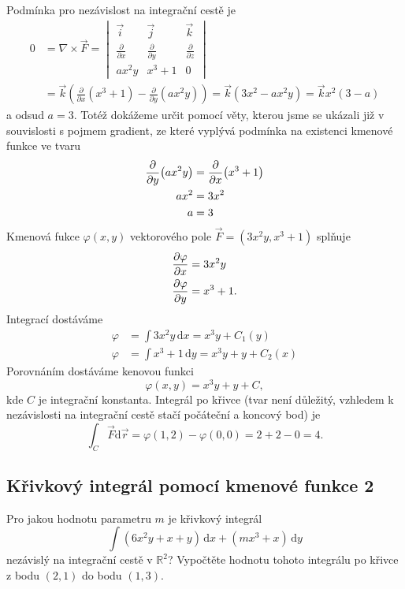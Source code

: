 Podmínka pro nezávislost na integrační cestě je $$
\begin{aligned}
0&=\nabla \times  \vec F
=\begin{vmatrix}
  \vec i & \vec j& \vec k \\
  \frac{\partial}{\partial x} &  \frac{\partial}{\partial y} &  \frac{\partial}{\partial z}\\
  ax^2y &  x^3+1 &  0
\end{vmatrix}
\\&=\vec k \left(  \frac{\partial}{\partial x} (x^3+1) - \frac{\partial }{\partial y} (ax^2y)\right)
  =\vec k(3x^2-ax^2y)=\vec k x^2(3-a)
\end{aligned}
  $$
  a odsud $a=3$. Totéž dokážeme určit pomocí věty, kterou jsme se ukázali již v souvislosti s pojmem gradient, ze které vyplývá podmínka na existenci kmenové funkce ve tvaru $$
\begin{aligned}
  \pdv{y}(ax^2y)&=\pdv{x}(x^3+1)\\
  ax^2&=3x^2\\
  a&=3
\end{aligned}
$$
Kmenová fukce $\varphi(x,y)$ vektorového pole $\vec F=(3x^2y,x^3+1)$ splňuje
$$
\begin{aligned}
  \pdv{\varphi}{x}&=3x^2y \\  \pdv{\varphi}{y}&=x^3+1.
\end{aligned}
$$
Integrací dostáváme
$$
\begin{aligned}
  \varphi &= \int 3x^2y\,\mathrm dx=x^3y+C_1(y)\\
  \varphi &= \int x^3+1\,\mathrm dy=x^3y+y+C_2(x)
\end{aligned}
$$
Porovnáním dostáváme kenovou funkci $$\varphi (x,y)=x^3y+y+C,$$ kde $C$ je integrační konstanta. Integrál po křivce (tvar není důležitý, vzhledem k nezávislosti na integrační cestě stačí počáteční a koncový bod) je
$$\int _C \vec F\mathrm d\vec r=\varphi(1,2)-\varphi(0,0)=2+2-0=4.$$


\konec

\subsection{Křivkový integrál pomocí kmenové funkce 2}

Pro jakou hodnotu parametru $m$ je křivkový integrál
$$\int (6x^2y+x+y)\,\mathrm dx+(mx^3+x)\,\mathrm dy$$ nezávislý na
integrační cestě v $\mathbb R^2$? Vypočtěte hodnotu tohoto integrálu
po křivce z bodu $(2,1)$ do bodu $(1,3)$.

\reseni


